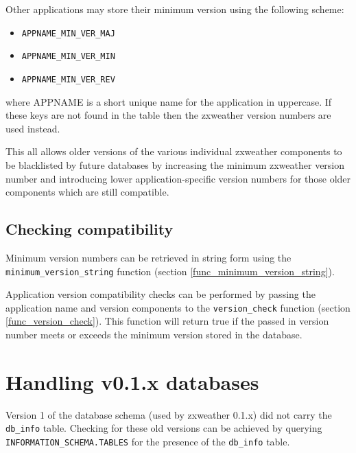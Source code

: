 \documentclass[a4paper,10pt]{book}
\newcommand{\partnumber}{\ifthenelse{\isundefined{\projectnum}}{}{\projectnum-\docnum	\ifthenelse{\equal{\docrev}{001}}{}{.\docrev}}}
\newcommand*\cleartoleftpage{%
  \clearpage
  \ifodd\value{page}\hbox{}\newpage\fi
}
\begin{document}
Other applications may store their minimum version using the following scheme:
\begin{itemize}
\item \verb|APPNAME_MIN_VER_MAJ|
\item \verb|APPNAME_MIN_VER_MIN|
\item \verb|APPNAME_MIN_VER_REV|
\end{itemize}
where APPNAME is a short unique name for the application in uppercase. If these keys are not found in the table then the zxweather version numbers are used instead.

This all allows older versions of the various individual zxweather components to be blacklisted by future databases by increasing the minimum zxweather version number and introducing lower application-specific version numbers for those older components which are still compatible.

\subsection{Checking compatibility}
Minimum version numbers can be retrieved in string form using the \verb|minimum_version_string| function (section \ref{func_minimum_version_string}).

Application version compatibility checks can be performed by passing the application name and version components to the \verb|version_check| function (section \ref{func_version_check}). This function will return true if the passed in version number meets or exceeds the minimum version stored in the database.

\section{Handling v0.1.x databases}
Version 1 of the database schema (used by zxweather 0.1.x) did not carry the \verb|db_info| table. Checking for these old versions can be achieved by querying \verb|INFORMATION_SCHEMA.TABLES| for the presence of the \verb|db_info| table.


\cleartoleftpage
\thispagestyle{empty}
\begin{flushright}
\null
\vfill
\tt \partnumber
\end{flushright}
\end{document}
